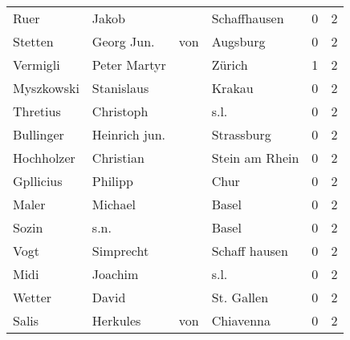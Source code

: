 \begin{tabular}{llllrr}
                     Ruer &                              Jakob &             &                                Schaffhausen &          0 &         2 \\
                  Stetten &                        Georg  Jun. &         von &                                    Augsburg &          0 &         2 \\
                 Vermigli &                       Peter Martyr &             &                                      Zürich &          1 &         2 \\
               Myszkowski &                         Stanislaus &             &                                      Krakau &          0 &         2 \\
                 Thretius &                          Christoph &             &                                        s.l. &          0 &         2 \\
                Bullinger &                      Heinrich jun. &             &                                  Strassburg &          0 &         2 \\
               Hochholzer &                          Christian &             &                              Stein am Rhein &          0 &         2 \\
                Gpllicius &                            Philipp &             &                                        Chur &          0 &         2 \\
                    Maler &                            Michael &             &                                       Basel &          0 &         2 \\
                    Sozin &                               s.n. &             &                                       Basel &          0 &         2 \\
                     Vogt &                          Simprecht &             &                               Schaff hausen &          0 &         2 \\
                     Midi &                            Joachim &             &                                        s.l. &          0 &         2 \\
                   Wetter &                              David &             &                                  St. Gallen &          0 &         2 \\
                    Salis &                           Herkules &         von &                                   Chiavenna &          0 &         2 \\

\end{tabular}
